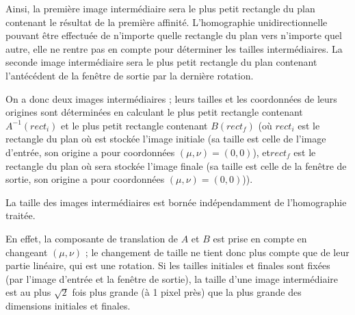  Ainsi, la première image intermédiaire sera le plus petit rectangle du plan contenant le résultat de la première affinité. L'homographie unidirectionnelle pouvant être effectuée de n'importe quelle rectangle du plan vers n'importe quel autre, elle ne rentre pas en compte pour déterminer les tailles intermédiaires. La seconde image intermédiaire sera le plus petit rectangle du plan contenant l'antécédent de la fenêtre de sortie par la dernière rotation.
 
 On a donc deux images intermédiaires ; leurs tailles et les coordonnées de leurs origines sont déterminées en calculant le plus petit rectangle contenant $A^{-1}(rect_i)$ et le plus petit rectangle contenant $B(rect_f)$ (où $rect_i$ est le rectangle du plan où est stockée l'image initiale (sa taille est celle de l'image d'entrée, son origine a pour coordonnées $(\mu,\nu)=(0,0)$), et$rect_f$ est le rectangle du plan où sera stockée l'image finale (sa taille est celle de la fenêtre de sortie, son origine a pour coordonnées $(\mu,\nu)=(0,0)$)).
 
 \begin{prop}
  La taille des images intermédiaires est bornée indépendamment de l'homographie traitée.
 \end{prop}
 En effet, la composante de translation de $A$ et $B$ est prise en compte en changeant $(\mu,\nu)$ ; le changement de taille ne tient donc plus compte que de leur partie linéaire, qui est une rotation. Si les tailles initiales et finales sont fixées (par l'image d'entrée et la fenêtre de sortie), la taille d'une image intermédiaire est au plus $\sqrt{2}$ fois plus grande (à 1 pixel près) que la plus grande des dimensions initiales et finales.
